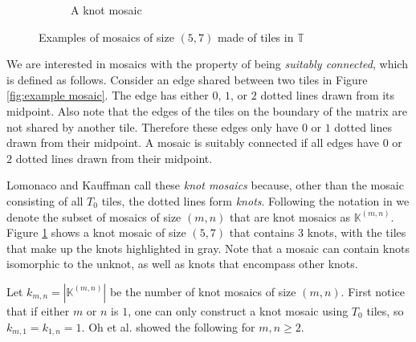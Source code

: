 \documentclass[12pt]{article}
\theoremstyle{plain}
\theoremstyle{definition}
\theoremstyle{remark}
\theoremstyle{definition}
\newcommand{\cell}[4]{ \draw[thick] ( #1 , #2 ) rectangle ( #3 , #4 );}
\newcommand{\cellAf}[4]{\filldraw[gray!40] ( #1 , #2 ) rectangle ( #3 , #4 ); \draw[red, thick, densely dotted] ( #1 + 0.5 , #2 ) arc(0:90:{0.5}); \draw[thick] ( #1 , #2 ) rectangle ( #3 , #4 );}
\newcommand{\cellBf}[4]{\filldraw[gray!40] ( #1 , #2 ) rectangle ( #3 , #4 ); \draw[red, thick, densely dotted] ( #1 + 1 , #2 + 0.5 ) arc(90:180:{0.5}); \draw[thick] ( #1 , #2 ) rectangle ( #3 , #4 );}
\newcommand{\cellCf}[4]{\filldraw[gray!40] ( #1 , #2 ) rectangle ( #3 , #4 ); \draw[red, thick, densely dotted] ( #1 + 0.5, #2 + 1 ) arc(180:270:{0.5}); \draw[thick] ( #1 , #2 ) rectangle ( #3 , #4 );}
\newcommand{\cellDf}[4]{\filldraw[gray!40] ( #1 , #2 ) rectangle ( #3 , #4 ); \draw[red, thick, densely dotted] ( #1 , #2 + 0.5 ) arc(-90:0:{0.5}); \draw[thick] ( #1 , #2 ) rectangle ( #3 , #4 );}
\newcommand{\cellEf}[4]{\filldraw[gray!40] ( #1 , #2 ) rectangle ( #3 , #4 ); \draw[red, thick, densely dotted] (#3, #4 * 0.5 + #2 * 0.5) -- (#1, #4 * 0.5 + #2 * 0.5); \draw[thick] ( #1 , #2 ) rectangle ( #3 , #4 );}
\newcommand{\cellFf}[4]{\filldraw[gray!40] ( #1 , #2 ) rectangle ( #3 , #4 ); \draw[red, thick, densely dotted] (#3 * 0.5 + #1 * 0.5 , #2) -- (#3 * 0.5 + #1 * 0.5 , #4); \draw[thick] ( #1 , #2 ) rectangle ( #3 , #4 );}
\begin{document}
\begin{figure}[h!]
\begin{center}
\begin{subfigure}{0.4\textwidth}
    \caption{A knot mosaic}
    \label{fig:example knot mosaic}
\end{subfigure}

\end{center}
\caption{Examples of mosaics of size $(5,7)$ made of tiles in $\mathbb{T}$}
\label{fig:example mosaics}
\end{figure}

We are interested in mosaics with the property of being \textit{suitably connected}, which is defined as follows. Consider an edge shared between two tiles in Figure \ref{fig:example mosaic}. The edge has either $0$, $1$, or $2$ dotted lines drawn from its midpoint. Also note that the edges of the tiles on the boundary of the matrix are not shared by another tile. Therefore these edges only have $0$ or $1$ dotted lines drawn from their midpoint. A mosaic is suitably connected if all edges have $0$ or $2$ dotted lines drawn from their midpoint.

Lomonaco and Kauffman \cite{Lomonaco08} call these \textit{knot mosaics} because, other than the mosaic consisting of all $T_0$ tiles, the dotted lines form  \textit{knots}. Following the notation in \cite{Oh2014} we denote the subset of mosaics of size $(m,n)$ that are knot mosaics as $\mathbb{K}^{(m,n)}$. Figure \ref{fig:example knot mosaic} shows a knot mosaic of size $(5,7)$ that contains $3$ knots, with the tiles that make up the knots highlighted in gray. Note that a mosaic can contain knots isomorphic to the unknot, as well as knots that encompass other knots. 

Let $k_{m,n} = |\mathbb{K}^{(m,n)}|$ be the number of knot mosaics of size $(m,n)$. First notice that if either $m$ or $n$ is $1$, one can only construct a knot mosaic using $T_0$ tiles, so $k_{m,1} = k_{1,n} = 1.$ Oh et al. \cite{Oh2014} showed the following for $m,n \geq 2$.
\end{document}
